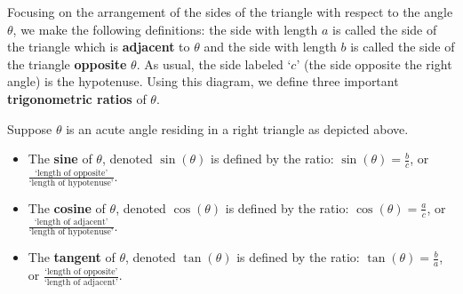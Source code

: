 \documentclass{ximera}
\begin{document}
Focusing on the arrangement of the sides of the triangle with respect to the angle $\theta$, we make the following definitions:  the side with length $a$  is called the side of the triangle which is  \textbf{adjacent} to  $\theta$ and the side with length $b$ is called the side of the triangle \textbf{opposite} $\theta$. As usual, the side labeled `$c$' (the side opposite the right angle) is the hypotenuse.  Using this diagram, we  define three important  \textbf{trigonometric ratios} of $\theta$.




\begin{definition} \label{righttrianglesinecosinetangent}    Suppose $\theta$ is an acute angle residing in a right triangle as depicted above.

\begin{itemize}

\item  The  \textbf{sine} of $\theta$, denoted $\sin(\theta)$ is defined by the ratio: $\sin(\theta) = \frac{b}{c}$, or $\frac{\text{`length of opposite'}}{\text{`length of hypotenuse'}}$.

\item  The  \textbf{cosine} of $\theta$, denoted $\cos(\theta)$ is defined by the ratio: $\cos(\theta) = \frac{a}{c}$, or $\frac{\text{`length of adjacent'}}{\text{`length of hypotenuse'}}$.

\item  The  \textbf{tangent} of $\theta$, denoted $\tan(\theta)$ is defined by the ratio: $\tan(\theta) = \frac{b}{a}$, or $\frac{\text{`length of opposite'}}{\text{`length of adjacent'}}$.\

\end{itemize}



\end{definition}

\end{document}
